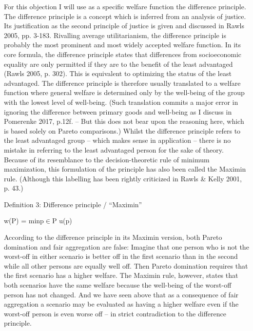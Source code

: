 For this objection I will use as a specific welfare function the difference principle. The difference principle is a concept which is inferred from an analysis of justice. Its justification as the second principle of justice is given and discussed in \label{ref:RNDaX1kFAqXc5}Rawls 2005, pp. 3-183. Rivalling average utilitarianism, the difference principle is probably the most prominent and most widely accepted welfare function. In its core formula, the difference principle states that differences from socioeconomic equality are only permitted if they are to the benefit of the least advantaged (\label{ref:RND4PXINhR0Cj}Rawls 2005, p. 302). This is equivalent to optimizing the status of the least advantaged. The difference principle is therefore usually translated to a welfare function where general welfare is determined only by the well-being of the group with the lowest level of well-being. (Such translation commits a major error in ignoring the difference between primary goods and well-being as I discuss in \label{ref:RNDxfDrFqEWzs}Pomerenke 2017, p.12f. – But this does not bear upon the reasoning here, which is based solely on Pareto comparisons.) Whilst the difference principle refers to the least advantaged group – which makes sense in application – there is no mistake in referring to the least advantaged person for the sake of theory. Because of its resemblance to the decision-theoretic rule of minimum maximization, this formulation of the principle has also been called the Maximin rule. (Although this labelling has been rightly criticized in \label{ref:RND4jKuJkTAlW}Rawls \& Kelly 2001, p. 43.) 

Definition 3: Difference principle / “Maximin” 

w(P) = minp${\in}$P u(p) 

According to the difference principle in its Maximin version, both Pareto domination and fair aggregation are false: Imagine that one person who is not the worst-off in either scenario is better off in the first scenario than in the second while all other persons are equally well off. Then Pareto domination requires that the first scenario has a higher welfare. The Maximin rule, however, states that both scenarios have the same welfare because the well-being of the worst-off person has not changed. And we have seen above that as a consequence of fair aggregation a scenario may be evaluated as having a higher welfare even if the worst-off person is even worse off – in strict contradiction to the difference principle.  

